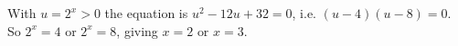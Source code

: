 With $u=2^x>0$ the equation is $u^2-12u+32=0$, i.e. $(u-4)(u-8)=0$. So $2^x=4$ or $2^x=8$, giving $\boxed{x=2\text{ or }x=3}$.
